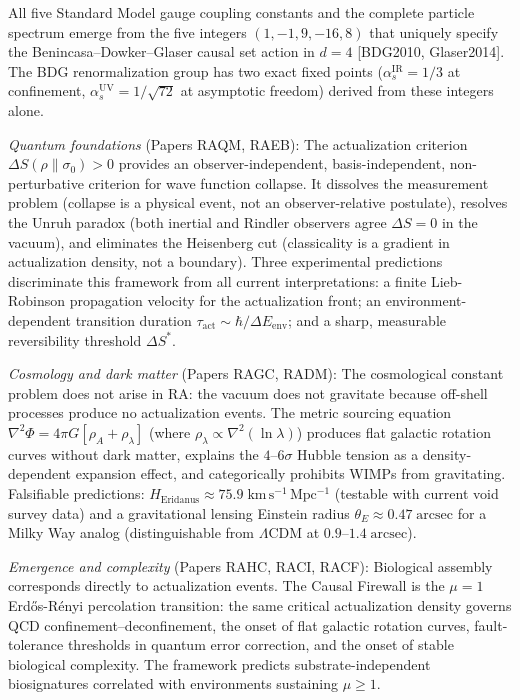 \documentclass[11pt]{article}
\begin{document}
\medskip
\noindent All five Standard Model gauge coupling constants and the
complete particle spectrum emerge from the five integers
$(1,-1,9,-16,8)$ that uniquely specify the Benincasa--Dowker--Glaser
causal set action in $d=4$ [BDG2010, Glaser2014].
The BDG renormalization group has two exact fixed points
($\alpha_s^{\mathrm{IR}} = 1/3$ at confinement,
$\alpha_s^{\mathrm{UV}} = 1/\sqrt{72}$ at asymptotic freedom) derived
from these integers alone.

\medskip
\noindent\textit{Quantum foundations} (Papers RAQM, RAEB):
The actualization criterion $\Delta S(\rho\|\sigma_0) > 0$
provides an observer-independent, basis-independent, non-perturbative
criterion for wave function collapse.
It dissolves the measurement problem (collapse is a physical event,
not an observer-relative postulate), resolves the Unruh paradox
(both inertial and Rindler observers agree $\Delta S = 0$ in the vacuum),
and eliminates the Heisenberg cut (classicality is a gradient in
actualization density, not a boundary).
Three experimental predictions discriminate this framework from all current
interpretations: a finite Lieb-Robinson propagation velocity for the
actualization front; an environment-dependent transition duration
$\tau_{\mathrm{act}} \sim \hbar/\Delta E_{\mathrm{env}}$; and a sharp,
measurable reversibility threshold $\Delta S^*$.

\medskip
\noindent\textit{Cosmology and dark matter} (Papers RAGC, RADM):
The cosmological constant problem does not arise in RA: the vacuum does
not gravitate because off-shell processes produce no actualization events.
The metric sourcing equation $\nabla^2\Phi = 4\pi G[\rho_A + \rho_\lambda]$
(where $\rho_\lambda \propto \nabla^2(\ln\lambda)$) produces flat galactic
rotation curves without dark matter, explains the $4$--$6\sigma$ Hubble
tension as a density-dependent expansion effect, and categorically prohibits
WIMPs from gravitating.
Falsifiable predictions: $H_{\mathrm{Eridanus}} \approx 75.9\;\mathrm{km\,s^{-1}\,Mpc^{-1}}$
(testable with current void survey data) and a gravitational lensing
Einstein radius $\theta_E \approx 0.47\;\mathrm{arcsec}$ for a Milky
Way analog (distinguishable from $\Lambda$CDM at $0.9$--$1.4\;\mathrm{arcsec}$).

\medskip
\noindent\textit{Emergence and complexity} (Papers RAHC, RACI, RACF):
Biological assembly corresponds directly to actualization events.
The Causal Firewall is the $\mu = 1$ Erd\H{o}s-R\'{e}nyi percolation
transition: the same critical actualization density governs QCD
confinement--deconfinement, the onset of flat galactic rotation curves,
fault-tolerance thresholds in quantum error correction, and the onset
of stable biological complexity.
The framework predicts substrate-independent biosignatures correlated with
environments sustaining $\mu \geq 1$.
\end{document}
